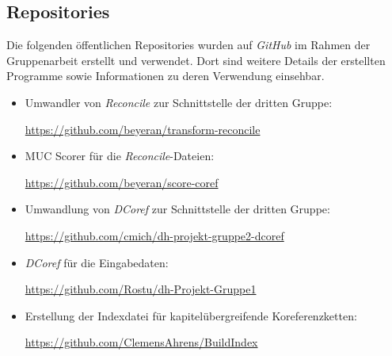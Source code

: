 \documentclass[a4paper,12pt,titlepage=true, ngerman]{scrartcl}
\begin{document}

\subsection{Repositories}\label{Repositories}

Die folgenden öffentlichen Repositories wurden auf \emph{GitHub} \autocite[]{chris_github} im Rahmen 
der Gruppenarbeit erstellt und verwendet. 
Dort sind weitere Details der erstellten Programme sowie Informationen zu deren Verwendung einsehbar.

\begin{itemize}
  \item Umwandler von \emph{Reconcile} zur Schnittstelle der dritten Gruppe:\par \url{https://github.com/beyeran/transform-reconcile}\vspace{0.3cm}
  \item MUC Scorer für die \emph{Reconcile}-Dateien:\par \url{https://github.com/beyeran/score-coref}\vspace{0.3cm}
  \item Umwandlung von \emph{DCoref} zur Schnittstelle der dritten Gruppe:\par \url{https://github.com/cmich/dh-projekt-gruppe2-dcoref}\vspace{0.3cm}
  \item \emph{DCoref} für die Eingabedaten:\par \url{https://github.com/Rostu/dh-Projekt-Gruppe1}\vspace{0.3cm}
  \item Erstellung der Indexdatei für kapitelübergreifende Koreferenzketten: \par \url{https://github.com/ClemensAhrens/BuildIndex}\vspace{0.3cm}
\end{itemize}



\newpage

\printbibliography[title=Literaturverzeichnis, heading=bibintoc]
\end{document}

